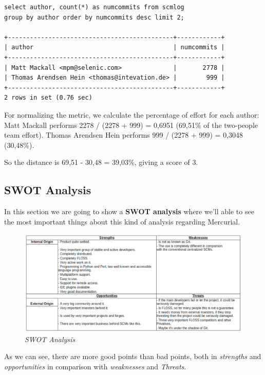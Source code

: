 \documentclass[a4paper,10pt]{article}
\begin{document}
\begin{verbatim}
select author, count(*) as numcommits from scmlog 
group by author order by numcommits desc limit 2;

+---------------------------------------------+------------+
| author                                      | numcommits |
+---------------------------------------------+------------+
| Matt Mackall <mpm@selenic.com>              |       2778 |
| Thomas Arendsen Hein <thomas@intevation.de> |        999 |
+---------------------------------------------+------------+
2 rows in set (0.76 sec)

\end{verbatim}
For normalizing the metric, we calculate the percentage of effort for each
author: Matt Mackall performs 2278 / (2278 + 999) = 0,6951 (69,51\% of the
two-people team effort). Thomas Arendsen Hein performs 999 / (2278 + 999) =
0,3048 (30,48\%). 

So the distance is 69,51 - 30,48 = 39,03\%, giving a score of 3.


\subsection{SWOT Analysis} \label{SWOT Analysis}

In this section we are going to show a \textbf{SWOT
analysis}\cite{swot_analysis} where we'll able to see the most important things
about this kind of analysis regarding Mercurial.

\begin{figure}[H]
    \centering
    \includegraphics[width=15cm, keepaspectratio]{img/swot_analysis.pdf}
    \caption{\textit{SWOT Analysis}}
    \label{figure:swot_analysis}
 \end{figure}

As we can see, there are more good points than bad points, both in
\textit{strengths} and \textit{opportunities} in comparison with
\textit{weaknesses} and \textit{Threats}.
\end{document}
